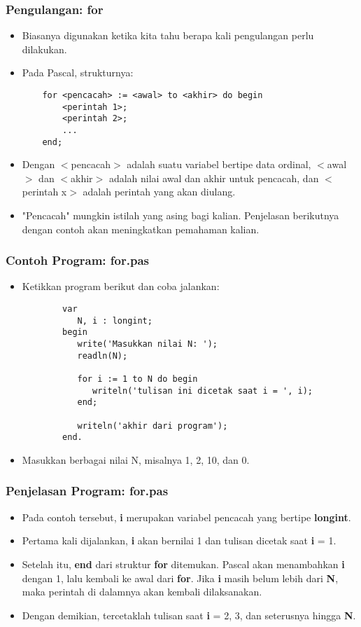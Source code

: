 \documentclass{beamer}
\begin{document}
\begin{frame}[fragile]
\frametitle{Pengulangan: for}
\begin{itemize}
    \item Biasanya digunakan ketika kita tahu berapa kali pengulangan perlu dilakukan.
    \item Pada Pascal, strukturnya:
    \begin{lstlisting}
    for <pencacah> := <awal> to <akhir> do begin
        <perintah 1>;
        <perintah 2>;
        ...
    end;
    \end{lstlisting}
    \item Dengan $<$pencacah$>$ adalah suatu variabel bertipe data \alert{ordinal}, $<$awal$>$ dan $<$akhir$>$ adalah nilai awal dan akhir untuk pencacah, dan $<$perintah x$>$ adalah perintah yang akan diulang.
    \item "Pencacah" mungkin istilah yang asing bagi kalian. Penjelasan berikutnya dengan contoh akan meningkatkan pemahaman kalian.
\end{itemize}
\end{frame}

\begin{frame}[fragile]
\frametitle{Contoh Program: for.pas}
\begin{itemize}
    \item Ketikkan program berikut dan coba jalankan:
    \begin{lstlisting}
        var
           N, i : longint;
        begin
           write('Masukkan nilai N: ');
           readln(N);

           for i := 1 to N do begin
              writeln('tulisan ini dicetak saat i = ', i);
           end;

           writeln('akhir dari program');
        end.
    \end{lstlisting}
    \item Masukkan berbagai nilai N, misalnya 1, 2, 10, dan 0.
\end{itemize}
\end{frame}

\begin{frame}
\frametitle{Penjelasan Program: for.pas}
\begin{itemize}
    \item Pada contoh tersebut, \textbf{i} merupakan variabel pencacah yang bertipe \textbf{longint}.
    \item Pertama kali dijalankan, \textbf{i} akan bernilai 1 dan tulisan dicetak saat \textbf{i} = 1.
    \item Setelah itu, \textbf{end} dari struktur \textbf{for} ditemukan. Pascal akan menambahkan \textbf{i} dengan 1, lalu kembali ke awal dari \textbf{for}. Jika \textbf{i} masih belum lebih dari \textbf{N}, maka perintah di dalamnya akan kembali dilaksanakan.
    \item Dengan demikian, tercetaklah tulisan saat \textbf{i} = 2, 3, dan seterusnya hingga \textbf{N}.
\end{itemize}
\end{frame}
\end{document}
